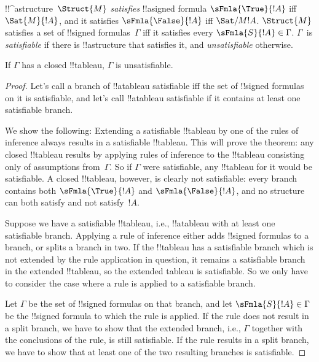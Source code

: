 \begin{defn}
!!^a{structure}~$\Struct{M}$
\emph{satisfies} !!a{signed formula} $\sFmla{\True}{!A}$ iff
$\Sat{M}{!A}$, and it satisfies
$\sFmla{\False}{!A}$ iff
$\Sat/{M}{!A}$. $\Struct{M}$
satisfies a set of !!{signed formula}s~$\Gamma$ iff it satisfies every
$\sFmla{S}{!A} \in \Gamma$. $\Gamma$~is \emph{satisfiable} if there is
!!a{structure} that satisfies it, and
\emph{unsatisfiable} otherwise.
\end{defn}

\begin{thm}[Soundness]
  If $\Gamma$ has a closed !!{tableau}, $\Gamma$ is unsatisfiable.
\end{thm}

\begin{proof}
Let's call a branch of !!a{tableau} satisfiable iff the set of
!!{signed formula}s on it is satisfiable, and let's call !!a{tableau}
satisfiable if it contains at least one satisfiable branch.

We show the following: Extending a satisfiable !!{tableau} by one of
the rules of inference always results in a satisfiable !!{tableau}.
This will prove the theorem: any closed !!{tableau} results by
applying rules of inference to the !!{tableau} consisting only of
assumptions from~$\Gamma$. So if $\Gamma$ were satisfiable, any
!!{tableau} for it would be satisfiable. A closed !!{tableau},
however, is clearly not satisfiable: every branch contains both
$\sFmla{\True}{!A}$ and $\sFmla{\False}{!A}$, and no structure can
both satisfy and not satisfy~$!A$.

Suppose we have a satisfiable !!{tableau}, i.e., !!a{tableau} with at
least one satisfiable branch. Applying a rule of inference either adds
!!{signed formula}s to a branch, or splits a branch in two. If the
!!{tableau} has a satisfiable branch which is not extended by the rule
application in question, it remains a satisfiable branch in the
extended !!{tableau}, so the extended tableau is satisfiable. So we
only have to consider the case where a rule is applied to a
satisfiable branch.

Let $\Gamma$ be the set of !!{signed formula}s on that branch, and
let $\sFmla{S}{!A} \in \Gamma$ be the !!{signed formula} to which the
rule is applied. If the rule does not result in a split branch, we
have to show that the extended branch, i.e., $\Gamma$ together with
the conclusions of the rule, is still satisfiable. If the rule results
in a split branch, we have to show that at least one of the two
resulting branches is satisfiable.
  

\end{proof}
